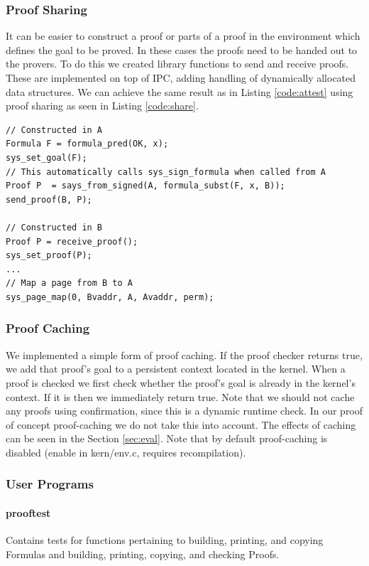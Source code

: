 \documentclass[10pt]{article}
\begin{document}
\subsubsection{Proof Sharing}
It can be easier to construct a proof or parts of a proof in the environment which defines the goal to be proved.  In these cases the proofs need to be handed out to the provers.  To do this we created library functions to send and receive proofs.  These are implemented on top of IPC, adding handling of dynamically allocated data structures.  We can achieve the same result as in Listing \ref{code:attest} using proof sharing as seen in Listing \ref{code:share}.
\begin{lstlisting}
// Constructed in A
Formula F = formula_pred(OK, x);
sys_set_goal(F);
// This automatically calls sys_sign_formula when called from A
Proof P  = says_from_signed(A, formula_subst(F, x, B));
send_proof(B, P);

// Constructed in B
Proof P = receive_proof();
sys_set_proof(P);
...
// Map a page from B to A
sys_page_map(0, Bvaddr, A, Avaddr, perm);
\end{lstlisting}

\subsubsection{Proof Caching}\label{sec:cache}
We implemented a simple form of proof caching.  If the proof checker returns true, we add that proof's goal to a persistent context located in the kernel.  When a proof is checked we first check whether the proof's goal is already in the kernel's context.  If it is then we immediately return true.  Note that we should not cache any proofs using confirmation, since this is a dynamic runtime check.  In our proof of concept proof-caching we do not take this into account.  The effects of caching can be seen in the Section \ref{sec:eval}.  Note that by default proof-caching is disabled (enable in \textsf{kern/env.c}, requires recompilation).

\subsubsection{User Programs}
\paragraph{prooftest} Contains tests for functions pertaining to building, printing, and copying Formulas and building, printing, copying, and checking Proofs.
\end{document}
